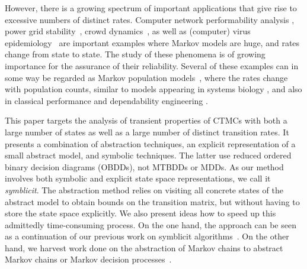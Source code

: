 \documentclass[10pt,twocolumn]{article}
\begin{document}
However, there is a growing spectrum of important applications that
give rise to excessive numbers of distinct rates.
Computer network performability analysis \cite{HaverkortHK00,ClothH05,BaierHHHK12,DBLP:journals/sqj/GokhaleLT04,DBLP:books/daglib/0079988},
power grid stability~\cite{DBLP:conf/nca/Sanders12,wsc12},
crowd dynamics~\cite{MassinkLBHH12,MassinkLBH11},
as well as (computer) virus epidemiology~\cite{XuLZ12,ZEB+11,YA11}
are important examples where Markov models are huge, and rates change
from state to state. The study of these phenomena is of growing
importance for the assurance of their reliability. Several
of these examples can in some way be regarded as Markov population
models~\cite{HenzingerJW11,HillstonTG12},
where the rates change with population counts, similar to models
appearing in systems biology \cite{MateescuWDH10}, and also in classical performance and
dependability engineering \cite{HaverkortHK00,ClothH05}.

This paper targets the analysis of transient properties of CTMCs with
both a large number of states as well as a large number of distinct
transition rates. It presents a combination of abstraction techniques,
an explicit representation of a small abstract model, and symbolic
techniques. The latter use reduced ordered binary decision diagrams (OBDDs), not MTBDDs or
MDDs. As our method involves both symbolic and explicit state space representations,
we call it \emph{symblicit}.
The abstraction method relies on
visiting all concrete states of the abstract model to obtain bounds on
the transition matrix, but without having to store the state space
explicitly. We also present ideas how to speed up this admittedly
time-consuming process. On the one hand, the approach can be seen
as a continuation of our previous work on symblicit
algorithms~\cite{WimmerBBHCHDT10,CrouzenHHDTWBB11}. On the other hand,
we harvest work done on the abstraction of Markov chains to abstract
Markov chains or Markov decision
processes~\cite{Klink10,Smith10,KatoenKLW07,Buchholz11,AlfaroR07,KattenbeltKNP10,HermannsWZ08}.
\end{document}
